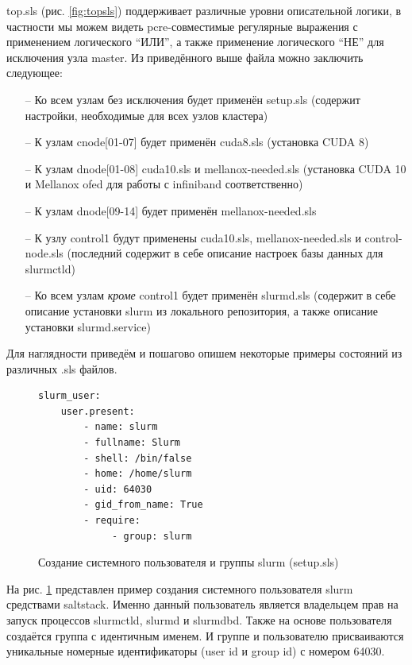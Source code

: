 \documentclass[a4paper]{extarticle}
\begin{document}
top.sls (рис. \ref{fig:topsls})  поддерживает различные уровни описательной логики, в частности мы можем видеть pcre-совместимые регулярные выражения с применением логического \enquote{ИЛИ}, а также применение логического \enquote{НЕ} для исключения узла master. Из приведённого выше файла можно заключить следующее:

\begin{itemize}
\item[--] Ко всем узлам без исключения будет применён setup.sls (содержит настройки, необходимые для всех узлов кластера)
\item[--] К узлам cnode[01-07] будет применён cuda8.sls (установка CUDA 8)
\item[--] К узлам dnode[01-08] cuda10.sls и mellanox-needed.sls (установка CUDA 10 и Mellanox ofed для работы с infiniband соответственно)
\item[--] К узлам dnode[09-14] будет применён mellanox-needed.sls
\item[--] К узлу control1 будут применены cuda10.sls, mellanox-needed.sls и control-node.sls (последний содержит в себе описание настроек базы данных для slurmctld)
\item[--] Ко всем узлам \emph{кроме} control1 будет применён slurmd.sls (содержит в себе описание установки slurm из локального репозитория, а также описание установки slurmd.service)
\end{itemize}

Для наглядности приведём и пошагово опишем некоторые примеры состояний из различных .sls файлов.

\begin{figure}[H]
\begin{verbatim}
slurm_user:
    user.present:
        - name: slurm
        - fullname: Slurm
        - shell: /bin/false
        - home: /home/slurm
        - uid: 64030
        - gid_from_name: True
        - require:
             - group: slurm
\end{verbatim}
\captionsetup{labelfont=bf, labelsep=space}
\caption{Создание системного пользователя и группы slurm (setup.sls)}
\label{fig:slurmuser}
\end{figure}

На рис. \ref{fig:slurmuser} представлен пример создания  системного пользователя slurm средствами saltstack. Именно данный пользователь является владельцем прав на запуск процессов slurmctld, slurmd и slurmdbd. Также на основе пользователя создаётся группа с идентичным именем. И группе и пользователю присваиваются уникальные номерные идентификаторы (user id и group id) с номером 64030.
\end{document}
